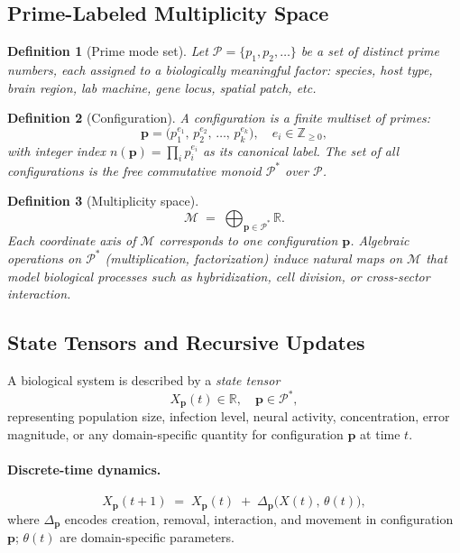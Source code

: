 \documentclass[12pt,letterpaper]{article}
\newtheorem{definition}{Definition}[section]
\newcommand{\Mcal}{\mathcal{M}}
\newcommand{\Pcal}{\mathcal{P}}
\newcommand{\bp}{\mathbf{p}}
\begin{document}
\subsection{Prime-Labeled Multiplicity Space}

\begin{definition}[Prime mode set]
Let $\Pcal = \{p_1, p_2, \ldots\}$ be a set of distinct prime numbers, each
assigned to a biologically meaningful factor: species, host type, brain region,
lab machine, gene locus, spatial patch, etc.
\end{definition}

\begin{definition}[Configuration]
A \emph{configuration} is a finite multiset of primes:
\[
  \bp = \bigl(p_1^{e_1},\, p_2^{e_2},\, \ldots,\, p_k^{e_k}\bigr),
  \quad e_i \in \mathbb{Z}_{\geq 0},
\]
with integer index $n(\bp) = \prod_i p_i^{e_i}$ as its canonical label.
The set of all configurations is the free commutative monoid $\Pcal^*$ over
$\Pcal$.
\end{definition}

\begin{definition}[Multiplicity space]
\[
  \Mcal \;=\; \bigoplus_{\bp \in \Pcal^*} \mathbb{R}.
\]
Each coordinate axis of $\Mcal$ corresponds to one configuration $\bp$.
Algebraic operations on $\Pcal^*$ (multiplication, factorization) induce
natural maps on $\Mcal$ that model biological processes such as hybridization,
cell division, or cross-sector interaction.
\end{definition}

\subsection{State Tensors and Recursive Updates}

A biological system is described by a \emph{state tensor}
\[
  X_{\bp}(t) \in \mathbb{R}, \quad \bp \in \Pcal^*,
\]
representing population size, infection level, neural activity, concentration,
error magnitude, or any domain-specific quantity for configuration $\bp$ at
time $t$.

\paragraph{Discrete-time dynamics.}
\begin{equation}
  X_{\bp}(t+1) \;=\; X_{\bp}(t) \;+\; \Delta_{\bp}\!\bigl(X(t),\,\theta(t)\bigr),
  \label{eq:discrete}
\end{equation}
where $\Delta_{\bp}$ encodes creation, removal, interaction, and movement
in configuration $\bp$; $\theta(t)$ are domain-specific parameters.
\end{document}
